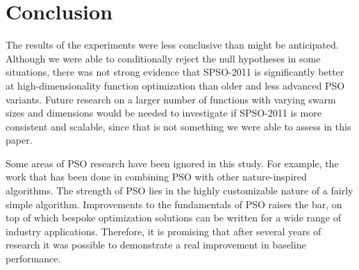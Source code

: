 \documentclass{csfourzero}
\begin{document}
\section{Conclusion}

The results of the experiments were less conclusive than might be anticipated.
Although we were able to conditionally reject the null hypotheses in some
situations, there was not strong evidence that SPSO-2011 is significantly better
at high-dimensionality function optimization than older and less advanced PSO
variants. Future research on a larger number of functions with varying swarm
sizes and dimensions would be needed to investigate if SPSO-2011 is more
consistent and scalable, since that is not something we were able to assess in
this paper.

Some areas of PSO research have been ignored in this study. For example, the
work that has been done in combining PSO with other nature-inspired algorithms.
The strength of PSO lies in the highly customizable nature of a fairly simple
algorithm.  Improvements to the fundamentals of PSO raises the bar, on top of
which bespoke optimization solutions can be written for a wide range of industry
applications. Therefore, it is promising that after several years of research it
was possible to demonstrate a real improvement in baseline performance.


\end{document}
